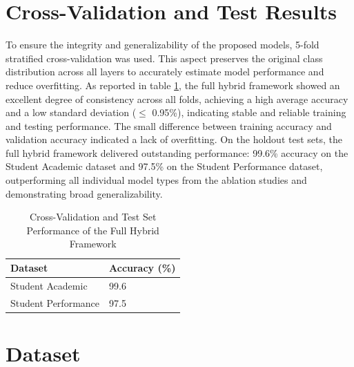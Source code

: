 \documentclass[twocolumn]{svjour3}
\begin{document}
\section{Cross-Validation and Test Results}
To ensure the integrity and generalizability of the proposed models, 5-fold stratified cross-validation was used. This aspect preserves the original class distribution across all layers to accurately estimate model performance and reduce overfitting. As reported in table \ref{tab:table17}, the full hybrid framework showed an excellent degree of consistency across all folds, achieving a high average accuracy and a low standard deviation ($\leq$ 0.95\%), indicating stable and reliable training and testing performance. The small difference between training accuracy and validation accuracy indicated a lack of overfitting. On the holdout test sets, the full hybrid framework delivered outstanding performance: 99.6\% accuracy on the Student Academic dataset and 97.5\% on the Student Performance dataset, outperforming all individual model types from the ablation studies and demonstrating broad generalizability.
\begin{table}[h]
\centering
\caption{Cross-Validation and Test Set Performance of the Full Hybrid Framework}
\label{tab:table17}
\begin{tabular}{ll}
\hline
Dataset & Accuracy (\%) \\
\hline
Student Academic & 99.6 \\
Student Performance & 97.5 \\
\hline
\end{tabular}
\end{table}

\section{Dataset}
\end{document}
